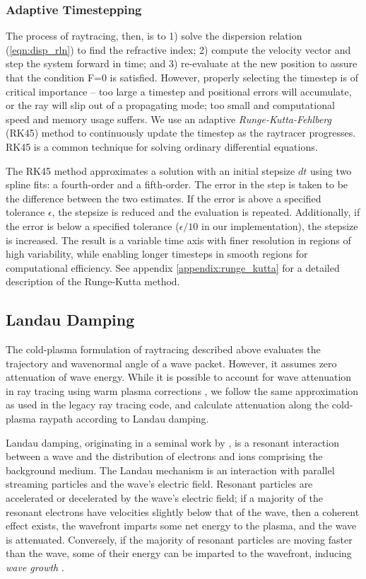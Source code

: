 \subsubsection{Adaptive Timestepping}
The process of raytracing, then, is to 1) solve the dispersion relation (\ref{eqn:disp_rln}) to find the refractive index; 2) compute the velocity vector and step the system forward in time; and 3) re-evaluate at the new position to assure that the condition F=0 is satisfied. However, properly selecting the timestep is of critical importance -- too large a timestep and positional errors will accumulate, or the ray will slip out of a propagating mode; too small and computational speed and memory usage suffers. We use an adaptive \emph{Runge-Kutta-Fehlberg} (RK45) \citep{Fehlberg1969, Mathews2004} method to continuously update the timestep as the raytracer progresses. RK45 is a common technique for solving ordinary differential equations.

The RK45 method approximates a solution with an initial stepsize $dt$ using two spline fits: a fourth-order and a fifth-order. The error in the step is taken to be the difference between the two estimates. If the error is above a specified tolerance $\epsilon$, the stepsize is reduced and the evaluation is repeated. Additionally, if the error is below a specified tolerance ($\epsilon/10$ in our implementation), the stepsize is increased. The result is a variable time axis with finer resolution in regions of high variability, while enabling longer timesteps in smooth regions for computational efficiency. See appendix \ref{appendix:runge_kutta} for a detailed description of the Runge-Kutta method.

\subsection{Landau Damping}
\label{section:damping}
The cold-plasma formulation of raytracing described above evaluates the trajectory and wavenormal angle of a wave packet. However, it assumes zero attenuation of wave energy. While it is possible to account for wave attenuation in ray tracing using warm plasma corrections \citep{Sazhin1993, Henyey1980}, we follow the same approximation as used in the legacy ray tracing code, and calculate attenuation along the cold-plasma raypath according to Landau damping.

Landau damping, originating in a seminal work by \cite{Landau1946}, is a resonant interaction between a wave and the distribution of electrons and ions comprising the background medium. The Landau mechanism is an interaction with parallel streaming particles and the wave's electric field. Resonant particles are accelerated or decelerated by the wave's electric field; if a majority of the resonant electrons have velocities slightly below that of the wave, then a coherent effect exists, the wavefront imparts some net energy to the plasma, and the wave is attenuated. Conversely, if the majority of resonant particles are moving faster than the wave, some of their energy can be imparted to the wavefront, inducing \emph{wave growth} \citep{Chen1983, Kulkarni2009}. 

